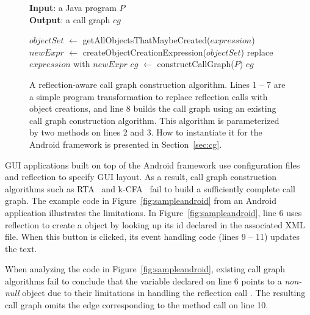 \begin{figure}[t]
\textbf{Input}: a Java program $\mathit{P}$\\
\textbf{Output}: a call graph $\mathit{cg}$\\
\vspace{-5mm}
\begin{algorithmic}[1]
\STATE $\mathit{objectSet}$ $\leftarrow$ getAllObjectsThatMaybeCreated($\mathit{expression}$)
\STATE $\mathit{newExpr}$ $\leftarrow$ createObjectCreationExpression($\mathit{objectSet}$)
\STATE replace $\mathit{expression}$ with $\mathit{newExpr}$
\ENDIF
\ENDFOR
\STATE $\mathit{cg}$ $\leftarrow$ constructCallGraph($\mathit{P}$)
\RETURN $\mathit{cg}$
\end{algorithmic}
\vspace{-3mm}
\caption{A reflection-aware call graph construction algorithm. Lines
1 -- 7 are a simple program transformation to replace reflection calls
with object creations, and line 8 builds the call graph using
an existing call graph construction algorithm. This algorithm
is parameterized by two methods on lines 2 and 3. 
How to instantiate it for the Android framework is presented in Section~\ref{sec:cg}.
} 
\label{fig:cgalgorithm}
\end{figure}

GUI applications built on top of the Android framework
use configuration files and reflection to specify GUI layout.
As a result, call graph construction algorithms such as RTA~\cite{rta}
and k-CFA~\cite{kcfa} fail to build a sufficiently complete call graph.
The example code in Figure~\ref{fig:sampleandroid} from an Android application
 illustrates the limitations.
In Figure~\ref{fig:sampleandroid}, line 6 uses reflection to create a 
object by looking up its id declared in the associated XML file. When this button
is clicked, its event handling code (lines 9 -- 11) updates the text.

When analyzing the code in Figure~\ref{fig:sampleandroid}, existing call graph algorithms
fail to conclude that the variable  declared on line 6
points to a \textit{non-null}  object due to their limitations in handling the
reflection call . The resulting call graph
omits the edge corresponding to the  method call on line 10.

